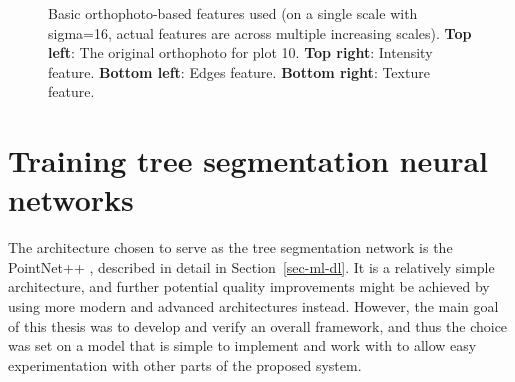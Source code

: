 \begin{figure}
\caption[Visualisation of basic orthophoto-based features (large
scale)]{\label{fig-basic-features-large}Basic orthophoto-based features
used (on a single scale with sigma=16, actual features are across
multiple increasing scales). \textbf{Top left}: The original orthophoto
for plot 10. \textbf{Top right}: Intensity feature. \textbf{Bottom
left}: Edges feature. \textbf{Bottom right}: Texture feature.}
\end{figure}

\section{Training tree segmentation neural networks}

The architecture chosen to serve as the tree segmentation network is the PointNet++ \citep{qiPointNetPlusPlus2017}, described in detail in Section~\ref{sec-ml-dl}.
It is a relatively simple architecture, and further potential quality improvements might be achieved by using more modern and advanced architectures instead.
However, the main goal of this thesis was to develop and verify an overall framework, and thus the choice was set on a model that is simple to implement and work with to allow easy experimentation with other parts of the proposed system.

